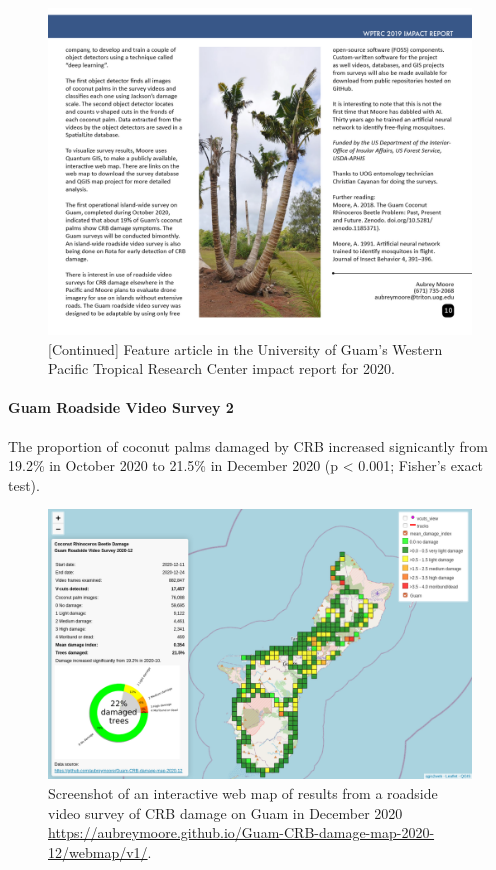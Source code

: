 \documentclass[12pt,letterpaper,english,bibliography=totocnumbered,abstract=on]{scrartcl}
\begin{document}
\begin{figure}[h]
	\centering
	\includegraphics[width=1\linewidth]{images/impact-report10.png}
	\caption{[Continued] Feature article in the University of Guam's Western Pacific Tropical Research Center impact report for 2020.}
	\label{fig:roadside1-4}
\end{figure}

\clearpage
\paragraph{Guam Roadside Video Survey 2}

The proportion of coconut palms damaged by CRB increased signicantly from 19.2\% in
October 2020 to 21.5\% in December 2020 (p < 0.001; Fisher's exact test).

\begin{figure}[h]
	\centering
	\includegraphics[width=1\linewidth]{images/crb-webmap-2020-12.png}
	\caption{Screenshot of an interactive web map of results from a roadside video survey of
		CRB damage on Guam in December 2020 \url{https://aubreymoore.github.io/Guam-CRB-damage-map-2020-12/webmap/v1/}.}
	\label{fig:guam02}
\end{figure}
\end{document}
